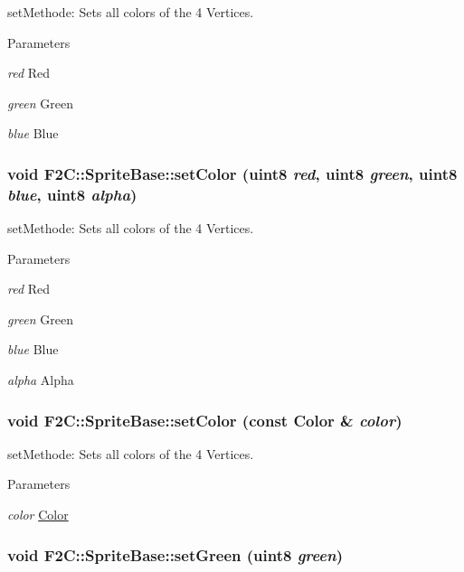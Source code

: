 setMethode: Sets all colors of the 4 Vertices. 
\begin{DoxyParams}{Parameters}
\item[{\em red}]Red \item[{\em green}]Green \item[{\em blue}]Blue \end{DoxyParams}
\hypertarget{class_f2_c_1_1_sprite_base_a70ecaf3b26c6a7e1490d276895a82694}{
\subsubsection[{setColor}]{\setlength{\rightskip}{0pt plus 5cm}void F2C::SpriteBase::setColor ({\bf uint8} {\em red}, \/  {\bf uint8} {\em green}, \/  {\bf uint8} {\em blue}, \/  {\bf uint8} {\em alpha})}}
\label{class_f2_c_1_1_sprite_base_a70ecaf3b26c6a7e1490d276895a82694}


setMethode: Sets all colors of the 4 Vertices. 
\begin{DoxyParams}{Parameters}
\item[{\em red}]Red \item[{\em green}]Green \item[{\em blue}]Blue \item[{\em alpha}]Alpha \end{DoxyParams}
\hypertarget{class_f2_c_1_1_sprite_base_a8dea109774f2021855921952a55dad34}{
\subsubsection[{setColor}]{\setlength{\rightskip}{0pt plus 5cm}void F2C::SpriteBase::setColor (const {\bf Color} \& {\em color})}}
\label{class_f2_c_1_1_sprite_base_a8dea109774f2021855921952a55dad34}


setMethode: Sets all colors of the 4 Vertices. 
\begin{DoxyParams}{Parameters}
\item[{\em color}]\hyperlink{class_f2_c_1_1_color}{Color} \end{DoxyParams}
\hypertarget{class_f2_c_1_1_sprite_base_a22cb562ef6c8e857cf78cd3037dbfe48}{
\subsubsection[{setGreen}]{\setlength{\rightskip}{0pt plus 5cm}void F2C::SpriteBase::setGreen ({\bf uint8} {\em green})}}
\label{class_f2_c_1_1_sprite_base_a22cb562ef6c8e857cf78cd3037dbfe48}


